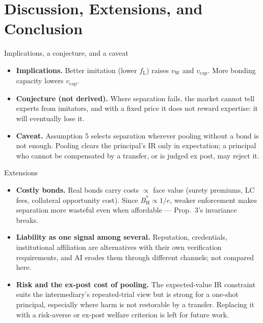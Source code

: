 \documentclass[11pt,aspectratio=169]{beamer}
\newcommand{\fL}{f_{\mathrm{L}}}
\newcommand{\BH}{B^{*}_{\mathrm{H}}}
\newcommand{\vcap}{v_{\mathrm{cap}}}
\newcommand{\vW}{v_{\mathrm{W}}}
\begin{document}

\section{Discussion, Extensions, and Conclusion}


\begin{frame}{Implications, a conjecture, and a caveat}
\small
\begin{itemize}
  \item \textbf{Implications.} Better imitation (lower $\fL$) raises $\vW$ and $\vcap$. More bonding capacity lowers $\vcap$.
  \vspace{6pt}
  \item \textbf{Conjecture (not derived).} Where separation fails, the market cannot tell experts from imitators, and with a fixed price it does not reward expertise: it will eventually lose it.
  \vspace{6pt}
  \item \textbf{Caveat.} Assumption 5 selects separation wherever pooling without a bond is not enough. Pooling clears the principal's IR only in expectation; a principal who cannot be compensated by a transfer, or is judged ex post, may reject it.
\end{itemize}
\end{frame}

\begin{frame}{Extensions}
\begin{itemize}
  \item \textbf{Costly bonds.} Real bonds carry costs $\propto$ face value (surety premiums, LC fees, collateral opportunity cost). Since $\BH\propto1/e$, weaker enforcement makes separation more wasteful even when affordable --- Prop.\ 3's invariance breaks.
  \vspace{6pt}
  \item \textbf{Liability as one signal among several.} Reputation, credentials, institutional affiliation are alternatives with their own verification requirements, and AI erodes them through different channels; not compared here.
  \vspace{6pt}
  \item \textbf{Risk and the ex-post cost of pooling.} The expected-value IR constraint suits the intermediary's repeated-trial view but is strong for a one-shot principal, especially where harm is not restorable by a transfer. Replacing it with a risk-averse or ex-post welfare criterion is left for future work.
\end{itemize}
\end{frame}
\end{document}
